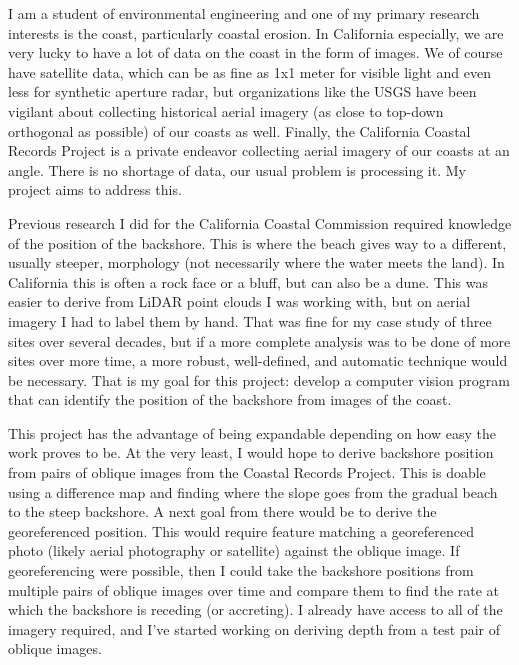 \documentclass[a4paper, 11pt]{article}
\begin{document}
I am a student of environmental engineering and one of my primary research interests is the coast, particularly coastal erosion.
In California especially, we are very lucky to have a lot of data on the coast in the form of images.
We of course have satellite data, which can be as fine as 1x1 meter for visible light and even less for synthetic aperture radar, but organizations like the USGS have been vigilant about collecting historical aerial imagery (as close to top-down orthogonal as possible) of our coasts as well.
Finally, the California Coastal Records Project is a private endeavor collecting aerial imagery of our coasts at an angle.
There is no shortage of data, our usual problem is processing it.
My project aims to address this.

Previous research I did for the California Coastal Commission required knowledge of the position of the backshore.
This is where the beach gives way to a different, usually steeper, morphology (not necessarily where the water meets the land).
In California this is often a rock face or a bluff, but can also be a dune.
This was easier to derive from LiDAR point clouds I was working with, but on aerial imagery I had to label them by hand.
That was fine for my case study of three sites over several decades, but if a more complete analysis was to be done of more sites over more time, a more robust, well-defined, and automatic technique would be necessary.
That is my goal for this project: develop a computer vision program that can identify the position of the backshore from images of the coast.

This project has the advantage of being expandable depending on how easy the work proves to be.
At the very least, I would hope to derive backshore position from pairs of oblique images from the Coastal Records Project.
This is doable using a difference map and finding where the slope goes from the gradual beach to the steep backshore.
A next goal from there would be to derive the georeferenced position.
This would require feature matching a georeferenced photo (likely aerial photography or satellite) against the oblique image.
If georeferencing were possible, then I could take the backshore positions from multiple pairs of oblique images over time and compare them to find the rate at which the backshore is receding (or accreting).
I already have access to all of the imagery required, and I've started working on deriving depth from a test pair of oblique images.
\end{document}
